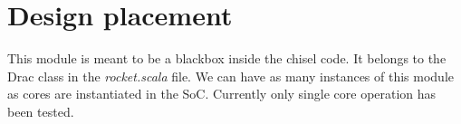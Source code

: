 \section{Design placement}
\label{chapter2}

This module is meant to be a blackbox inside the chisel code. It belongs to the Drac class in the \emph{rocket.scala} file. We can have as many instances of this module as cores are instantiated in the SoC. Currently only single core operation has been tested. 




